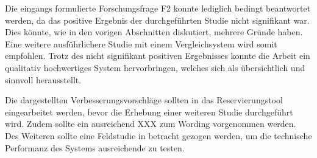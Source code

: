 Die eingangs formulierte Forschungsfrage F2 konnte lediglich bedingt beantwortet werden, da das
positive Ergebnis der durchgeführten Studie nicht signifikant war. Dies könnte, wie in den
vorigen Abschnitten diskutiert, mehrere Gründe haben. Eine weitere ausführlichere
Studie mit einem Vergleichsystem wird somit empfohlen. Trotz des nicht
signifikant positiven Ergebnisses konnte die Arbeit ein qualitativ hochwertiges System
hervorbringen, welches sich als übersichtlich und sinnvoll herausstellt.

Die dargestellten Verbesserungsvorschläge sollten in das Reservierungstool eingearbeitet werden,
bevor die Erhebung einer weiteren Studie durchgeführt wird. Zudem sollte ein ausreichend
XXX zum Wording vorgenommen werden. Des Weiteren sollte eine Feldstudie in betracht gezogen werden,
um die technische Performanz des Systems ausreichende zu testen.